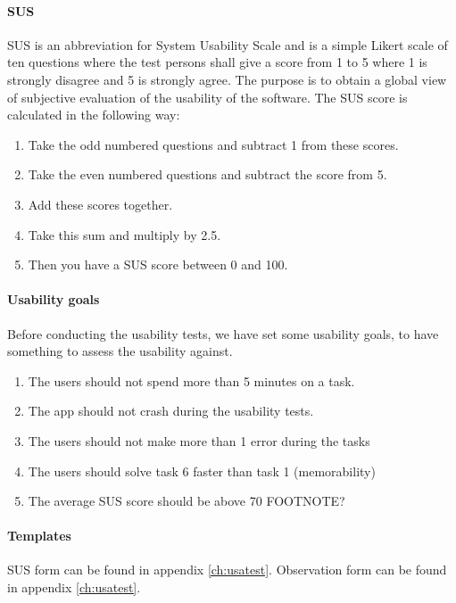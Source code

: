 \paragraph{SUS}\hfill
\newline
SUS is an abbreviation for System Usability Scale \cite{bib:sus} and is a simple Likert scale of ten questions where the test persons shall give a score from 1 to 5 where 1 is strongly disagree and 5 is strongly agree. The purpose is to obtain a global view of subjective evaluation of the usability of the software.
\newline
The SUS score is calculated in the following way:
\begin{enumerate}
\item{}Take the odd numbered questions and subtract 1 from these scores.
\item{}Take the even numbered questions and subtract the score from 5.
\item{}Add these scores together. 
\item{}Take this sum and multiply by 2.5.
\item{}Then you have a SUS score between 0 and 100.
\end{enumerate}

\paragraph{Usability goals}\hfill
\newline
Before conducting the usability tests, we have set some usability goals, to have something to assess the usability against.
\begin{enumerate}
\item{}The users should not spend more than 5 minutes on a task.
\item{}The app should not crash during the usability tests.
\item{}The users should not make more than 1 error during the tasks
\item{}The users should solve task 6 faster than task 1 (memorability)
\item{}The average SUS score should be above 70 FOOTNOTE?
\end{enumerate}

\paragraph{Templates}\hfill
\newline
SUS form can be found in appendix \ref{ch:usatest}.
\newline\newline
Observation form can be found in appendix \ref{ch:usatest}.

